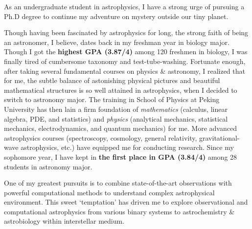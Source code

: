 \documentclass[11pt, a4paper]{awesome-cv} %
\begin{document}
\makecvheader %



\begin{cvletter}


As an undergraduate student in astrophysics, I have a strong urge of pursuing a Ph.D degree to continue my adventure on mystery outside our tiny planet. 

Though having been fascinated by astrophysics for long, the strong faith of being an astronomer, I believe, dates back in my freshman year in biology major. Though I got the \textbf{highest GPA (3.87/4)} among 120 freshmen in biology, I was finally tired of cumbersome taxonomy and test-tube-washing. Fortunate enough, after taking several fundamental courses on physics \& astronomy, I realized that for me, the subtle balance of astonishing physical pictures and beautiful mathematical structures is so well attained in astrophysics, when I decided to switch to astronomy major. The training in School of Physics at Peking University has then lain a firm foundation of \textit{mathematics} (calculus, linear algebra, PDE, and statistics) and \textit{physics} (analytical mechanics, statistical mechanics, electrodynamics, and quantum mechanics) for me. More advanced astrophysics courses (spectroscopy, cosmology, general relativity, gravitational-wave astrophysics, etc.) have equipped me for conducting research. Since my sophomore year, I have kept in \textbf{the first place in GPA (3.84/4)} among 28 students in astronomy major.

One of my greatest pursuits is to combine state-of-the-art observations with powerful computational methods to understand complex astrophysical environment. This sweet `temptation' has driven me to explore observational and computational astrophysics from various binary systems to astrochemistry \& astrobiology within interstellar medium.



\end{cvletter}
\end{document}
